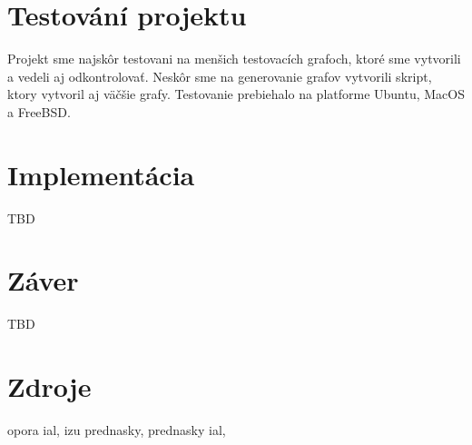 \documentclass[a4paper,11pt]{article}
\begin{document}
\section{Testování projektu}
Projekt sme najskôr testovani na menšich testovacích grafoch, ktoré sme vytvorili a vedeli aj odkontrolovať. Neskôr sme na generovanie grafov vytvorili skript, ktory vytvoril aj väčšie grafy. Testovanie prebiehalo na platforme Ubuntu, MacOS a FreeBSD.

\section{Implementácia}
TBD

\section{Záver}
TBD

\section{Zdroje}
opora ial,
izu prednasky,
prednasky ial, 
\end{document}

